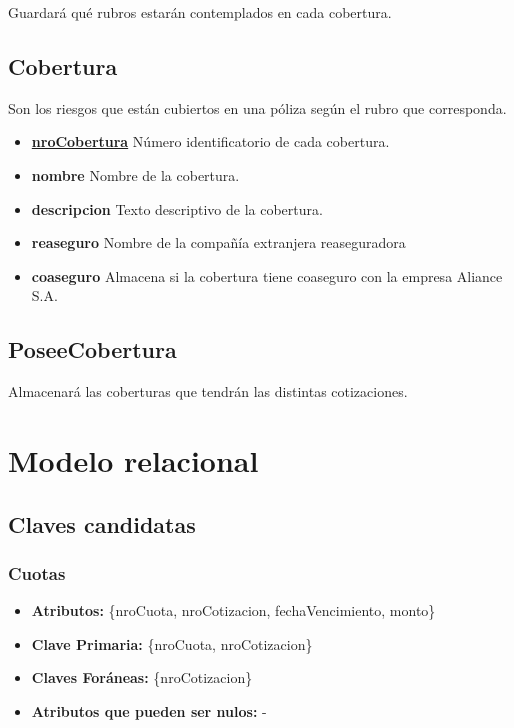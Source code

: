 \documentclass[a4paper,11pt]{article}
\begin{document}
Guardará qué rubros estarán contemplados en cada cobertura.

\subsection{Cobertura}

Son los riesgos que están cubiertos en una póliza según el rubro que corresponda.

\begin{itemize}
   
  \item \textbf{\uline{nroCobertura}} Número identificatorio de cada cobertura.
  
  \item \textbf{nombre} Nombre de la cobertura.

  \item \textbf{descripcion} Texto descriptivo de la cobertura.
  
  \item \textbf{reaseguro} Nombre de la compañía extranjera reaseguradora

  \item \textbf{coaseguro} Almacena si la cobertura tiene coaseguro con la empresa Aliance S.A.
  
\end{itemize}

\subsection{PoseeCobertura}

Almacenará las coberturas que tendrán las distintas cotizaciones.


\section{Modelo relacional}

\subsection{Claves candidatas}

\subsubsection{Cuotas}

\begin{itemize}

	\item \textbf{Atributos:} \{nroCuota, nroCotizacion, fechaVencimiento, monto\}

	\item \textbf{Clave Primaria:} \{nroCuota, nroCotizacion\}

	\item \textbf{Claves Foráneas:} \{nroCotizacion\}

	\item \textbf{Atributos que pueden ser nulos:} -
	
\end{itemize}
\end{document}
